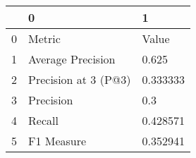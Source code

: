\begin{tabular}{lll}
\toprule
{} &                     0 &         1 \\
\midrule
0 &                Metric &     Value \\
1 &     Average Precision &     0.625 \\
2 &  Precision at 3 (P@3) &  0.333333 \\
3 &             Precision &       0.3 \\
4 &                Recall &  0.428571 \\
5 &            F1 Measure &  0.352941 \\
\bottomrule
\end{tabular}

